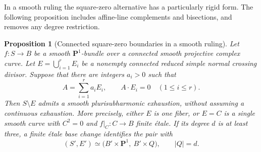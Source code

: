 \documentclass[11pt]{amsart}
\newtheorem{proposition}[theorem]{Proposition}
\theoremstyle{definition}
\theoremstyle{remark}
\numberwithin{equation}{section}
\newcommand{\PP}{\mathbf P}
\begin{document}
In a smooth ruling the square-zero alternative has a particularly
rigid form. The following proposition includes affine-line complements
and bisections, and removes any degree restriction.

\begin{proposition}[Connected square-zero boundaries in a smooth ruling]
\label{prop:ruled-all-degrees-zero}
Let $f:S\to B$ be a smooth $\PP^1$-bundle over a connected smooth
projective complex curve. Let $E=\bigcup_{i=1}^r E_i$ be a nonempty connected
reduced simple normal crossing divisor. Suppose that there are integers
$a_i>0$ such that
\[
 A=\sum_{i=1}^r a_iE_i,\qquad A\cdot E_i=0\quad(1\le i\le r).
\]
Then $S\setminus E$ admits a smooth plurisubharmonic exhaustion, without
assuming a continuous exhaustion. More precisely, either $E$ is one fiber,
or $E=C$ is a single smooth curve with $C^2=0$ and $f|_C:C\to B$ finite
\'etale. If its degree $d$ is at least three, a finite \'etale base change
identifies the pair with
\[
 (S',E')\simeq
 \bigl(B'\times\PP^1,\ B'\times Q\bigr),
 \qquad |Q|=d.
\]
\end{proposition}
\end{document}
